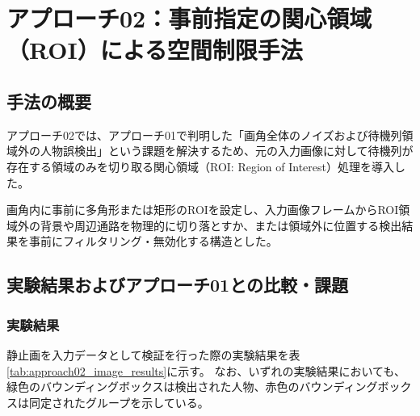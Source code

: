 \section{アプローチ02：事前指定の関心領域（ROI）による空間制限手法}

\subsection{手法の概要}
アプローチ02では、アプローチ01で判明した「画角全体のノイズおよび待機列領域外の人物誤検出」という課題を解決するため、元の入力画像に対して待機列が存在する領域のみを切り取る関心領域（ROI: Region of Interest）処理を導入した。

画角内に事前に多角形または矩形のROIを設定し、入力画像フレームからROI領域外の背景や周辺通路を物理的に切り落とすか、または領域外に位置する検出結果を事前にフィルタリング・無効化する構造とした。

\subsection{実験結果およびアプローチ01との比較・課題}

\subsubsection{実験結果}
静止画を入力データとして検証を行った際の実験結果を表\ref{tab:approach02_image_results}に示す。
なお、いずれの実験結果においても、緑色のバウンディングボックスは検出された人物、赤色のバウンディングボックスは同定されたグループを示している。

